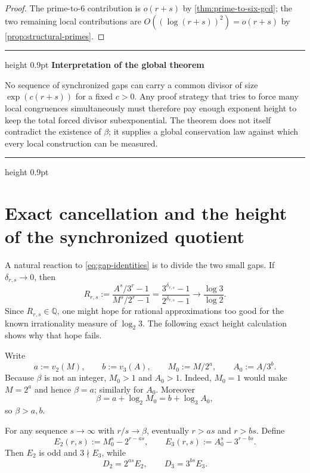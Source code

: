 \documentclass[11pt,oneside]{article}
\theoremstyle{definition}
\newenvironment{resultbox}[1]{%
  \par\medskip\noindent
  \begin{minipage}{\linewidth}
  \hrule height 0.9pt\vspace{0.5em}
  {\color{deepteal}\bfseries #1}\par\smallskip
}{%
  \vspace{0.35em}\hrule height 0.9pt
  \end{minipage}\par\medskip
}
\newcommand{\Q}{\mathbb{Q}}
\begin{document}
\begin{proof}
The prime-to-$6$ contribution is $o(r+s)$ by
\cref{thm:prime-to-six-gcd}; the two remaining local contributions are
$O((\log(r+s))^2)=o(r+s)$ by \cref{prop:structural-primes}.
\end{proof}

\begin{resultbox}{Interpretation of the global theorem}
No sequence of synchronized gaps can carry a common divisor of size
$\exp(c(r+s))$ for a fixed $c>0$.  Any proof strategy that tries to force
many local congruences simultaneously must therefore pay enough exponent
height to keep the total forced divisor subexponential.  The theorem does
not itself contradict the existence of $\beta$; it supplies a global
conservation law against which every local construction can be measured.
\end{resultbox}

\section{Exact cancellation and the height of the synchronized quotient}
\label{sec:height}

A natural reaction to \eqref{eq:gap-identities} is to divide the two small
gaps.  If $\delta_{r,s}\to0$, then
\begin{equation}\label{eq:natural-ratio}
  R_{r,s}
  :=\frac{A^s/3^r-1}{M^s/2^r-1}
  =\frac{3^{\delta_{r,s}}-1}{2^{\delta_{r,s}}-1}
  \longrightarrow \frac{\log3}{\log2}.
\end{equation}
Since $R_{r,s}\in\Q$, one might hope for rational approximations too good
for the known irrationality measure of $\log_2 3$.  The following exact
height calculation shows why that hope fails.

Write
\begin{equation}\label{eq:primitive-parts}
  a:=v_2(M),\qquad b:=v_3(A),\qquad
  M_0:=M/2^a,\qquad A_0:=A/3^b.
\end{equation}
Because $\beta$ is not an integer, $M_0>1$ and $A_0>1$.  Indeed,
$M_0=1$ would make $M=2^a$ and hence $\beta=a$; similarly for $A_0$.
Moreover
\begin{equation}\label{eq:beta-parts}
  \beta=a+\log_2 M_0=b+\log_3 A_0,
\end{equation}
so $\beta>a,b$.

For any sequence $s\to\infty$ with $r/s\to\beta$, eventually $r>as$ and
$r>bs$.  Define
\begin{equation}\label{eq:E2E3}
  E_2(r,s):=M_0^s-2^{r-as},
  \qquad
  E_3(r,s):=A_0^s-3^{r-bs}.
\end{equation}
Then $E_2$ is odd and $3\nmid E_3$, while
\begin{equation}\label{eq:Dfactor}
  D_2=2^{as}E_2,
  \qquad D_3=3^{bs}E_3.
\end{equation}
\end{document}
